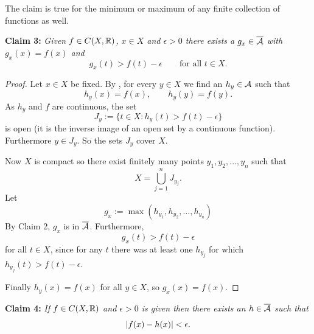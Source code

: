 The claim is true for the minimum or maximum of any finite
collection of functions as well.

\medskip

\noindent
\textbf{Claim 3:} \emph{Given $f \in C(X,{\mathbb{R}})$, $x \in X$ and $\epsilon > 0$
there exists a $g_x \in \overline{{\mathcal{A}}}$ with $g_x(x) = f(x)$ and
}
\begin{equation*}
g_x(t) > f(t)-\epsilon \qquad \text{for all $t \in X$}.
\end{equation*}

\begin{proof}
Let $x \in X$ be fixed.
By , for every $y \in X$ we find an $h_y \in
{\mathcal{A}}$ such that
\begin{equation*}
h_y(x) = f(x), \qquad h_y(y)=f(y) .
\end{equation*}
As $h_y$ and $f$ are continuous, the set
\begin{equation*}
J_y := \{ t \in X : h_y(t) > f(t) -\epsilon \}
\end{equation*}
is open (it is the inverse image of an open set by a continuous function).
Furthermore $y \in J_y$.  So the sets $J_y$ cover $X$.

Now $X$ is compact so there exist finitely many points $y_1,y_2,\ldots,y_n$ such
that
\begin{equation*}
X = \bigcup_{j=1}^n J_{y_j}  .
\end{equation*}
Let 
\begin{equation*}
g_x := \max(h_{y_1},h_{y_2},\ldots,h_{y_n})
\end{equation*}
By Claim 2, $g_x$ is in $\overline{{\mathcal{A}}}$.
Furthermore,
\begin{equation*}
g_x(t) > f(t) -\epsilon
\end{equation*}
for all $t \in X$, since for any $t$ there was at least one $h_{y_j}$ for
which $h_{y_j}(t) > f(t) -\epsilon$.

Finally $h_y(x) = f(x)$ for all $y \in X$, so
$g_x(x) = f(x)$.
\end{proof}

\medskip

\noindent
\textbf{Claim 4:} \emph{If $f \in C(X,{\mathbb{R}})$ and $\epsilon > 0$ is given then there
exists an $h \in \overline{{\mathcal{A}}}$ such that}
\begin{equation*}
\lvert {f(x) - h(x)} \rvert < \epsilon .
\end{equation*}


